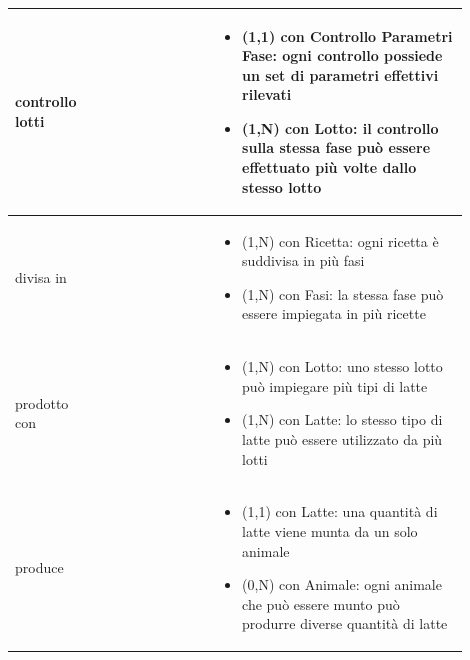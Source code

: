 \documentclass[12pt,a4paper]{article}
\begin{document}
\begin{center}
\begin{longtable}{|p{0.16\linewidth}|p{0.24\linewidth}|p{0.50\linewidth}|}
\hline
controllo lotti 				& \begin{flushleft}\vspace{-25pt} \end{flushleft}
					& \begin{itemize}
						\setlength{\itemindent}{-1em}
						\vspace{-25pt}
						\setlength\itemsep{-0.25em}
						\item (1,1) con Controllo Parametri Fase: ogni controllo possiede un set di parametri effettivi rilevati
						\item (1,N) con Lotto: il controllo sulla stessa fase può essere effettuato più volte dallo stesso lotto
					\end{itemize}\\ 

\hline
divisa in 				& \begin{flushleft}\vspace{-15pt}  \end{flushleft}
					& \begin{itemize}
						\setlength{\itemindent}{-1em}
						\vspace{-25pt}
						\setlength\itemsep{-0.25em}
						\item (1,N) con Ricetta: ogni ricetta è suddivisa in più fasi
						\item (1,N) con Fasi: la stessa fase può essere impiegata in più ricette
					\end{itemize}\\ 

\hline
prodotto con 				& \begin{flushleft}\vspace{-15pt}  \end{flushleft}
					& \begin{itemize}
						\setlength{\itemindent}{-1em}
						\vspace{-25pt}
						\setlength\itemsep{-0.25em}
						\item (1,N) con Lotto: uno stesso lotto può impiegare più tipi di latte
						\item (1,N) con Latte: lo stesso tipo di latte può essere utilizzato da più lotti
					\end{itemize}\\ 

\hline
produce 				& \begin{flushleft}\vspace{-15pt}  \end{flushleft}
					& \begin{itemize}
						\setlength{\itemindent}{-1em}
						\vspace{-25pt}
						\setlength\itemsep{-0.25em}
						\item (1,1) con Latte: una quantità di latte viene munta da un solo animale
						\item (0,N) con Animale: ogni animale che può essere munto può produrre diverse quantità di latte
					\end{itemize}\\ 


\end{longtable}
\end{center}
\end{document}
